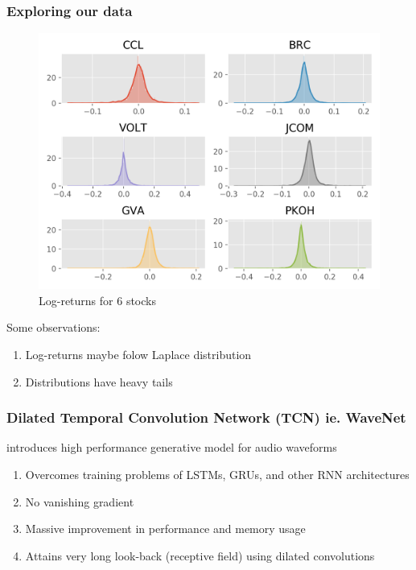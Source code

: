 \documentclass{beamer}
\begin{document}
\begin{frame}

    \frametitle{Exploring our data}

    \begin{figure}
        \center
        \caption{Log-returns for 6 stocks}
    \includegraphics[scale=0.5]{log_ret}
\end{figure}

\end{frame}

\begin{frame}

Some observations:

\begin{enumerate}

    \item Log-returns maybe folow Laplace distribution

    \item Distributions have heavy tails

\end{enumerate}

\end{frame}

\begin{frame}

    \frametitle{Dilated Temporal Convolution Network (TCN) ie. WaveNet}

    \citep{wavenet:1} introduces high performance generative model for audio waveforms

    \begin{enumerate}

        \item Overcomes training problems of LSTMs, GRUs, and other RNN architectures

        \item No vanishing gradient

        \item Massive improvement in performance and memory usage
        
        \item Attains very long look-back (receptive field) using dilated convolutions

    \end{enumerate}

\end{frame}
\end{document}
